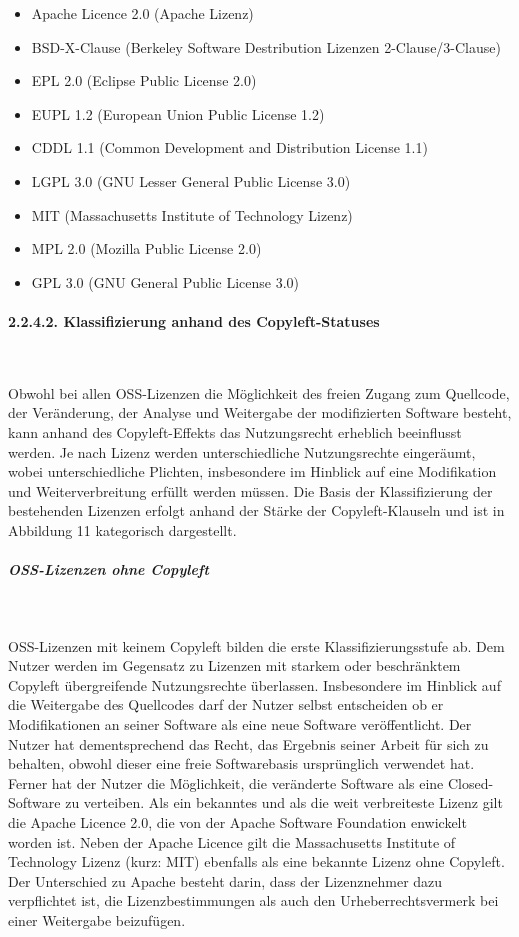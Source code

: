 \begin{itemize}
    \item Apache Licence 2.0 (Apache Lizenz)
    \item BSD-X-Clause (Berkeley Software Destribution Lizenzen 2-Clause/3-Clause)
    \item EPL 2.0 (Eclipse Public License 2.0)
    \item EUPL 1.2 (European Union Public License 1.2)
    \item CDDL 1.1 (Common Development and Distribution License 1.1)
    \item LGPL 3.0 (GNU Lesser General Public License 3.0)
    \item MIT (Massachusetts Institute of Technology Lizenz)
    \item MPL 2.0 (Mozilla Public License 2.0)
    \item GPL 3.0 (GNU General Public License 3.0)
\end{itemize}

\paragraph{2.2.4.2. Klassifizierung anhand des Copyleft-Statuses}$~$

Obwohl bei allen OSS-Lizenzen die Möglichkeit des freien Zugang zum Quellcode, der Veränderung, der Analyse und Weitergabe der modifizierten Software besteht, kann anhand des Copyleft-Effekts das Nutzungsrecht erheblich beeinflusst werden. Je nach Lizenz werden unterschiedliche Nutzungsrechte eingeräumt, wobei  unterschiedliche Plichten, insbesondere im Hinblick auf eine Modifikation und Weiterverbreitung erfüllt werden müssen. Die Basis der Klassifizierung der bestehenden Lizenzen erfolgt anhand der Stärke der Copyleft-Klauseln und ist in Abbildung 11 kategorisch dargestellt.

\subparagraph{OSS-Lizenzen ohne Copyleft}$~$

OSS-Lizenzen mit keinem Copyleft bilden die erste Klassifizierungsstufe ab. Dem Nutzer werden im Gegensatz zu Lizenzen mit starkem oder beschränktem Copyleft übergreifende Nutzungsrechte überlassen. Insbesondere im Hinblick auf die Weitergabe des Quellcodes darf der Nutzer selbst entscheiden ob er  Modifikationen an seiner Software als eine neue Software veröffentlicht. Der Nutzer hat dementsprechend das Recht, das Ergebnis seiner Arbeit für sich zu behalten, obwohl dieser eine freie Softwarebasis ursprünglich verwendet hat. \cite[S. 17]{bitkom_open_2016} Ferner hat der Nutzer die Möglichkeit, die veränderte Software als eine Closed-Software zu verteiben. Als ein bekanntes und als die weit verbreiteste Lizenz gilt die Apache Licence 2.0, die von der Apache Software Foundation \cite{the_apache_software_foundation_apache_2004} enwickelt worden ist. Neben der Apache Licence gilt die Massachusetts Institute of Technology Lizenz (kurz: MIT) \cite{open_source_inititative_open_nodate} ebenfalls als eine bekannte Lizenz ohne Copyleft. Der Unterschied zu Apache besteht darin, dass der Lizenznehmer dazu verpflichtet ist, die Lizenzbestimmungen als auch den Urheberrechtsvermerk bei einer Weitergabe beizufügen. 

